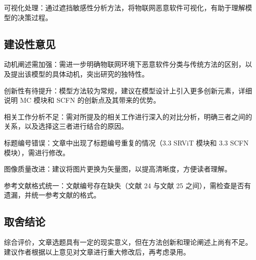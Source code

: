 \documentclass[11pt,a4paper]{article}
\begin{document}
可视化处理：通过遮挡敏感性分析方法，将物联网恶意软件可视化，有助于理解模型的决策过程。

\subsection{建设性意见}

动机阐述需加强：需进一步明确物联网环境下恶意软件分类与传统方法的区别，以及提出该模型的具体动机，突出研究的独特性。

创新性有待提升：模型方法较为常规，建议在模型设计上引入更多创新元素，详细说明 MC 模块和 SCFN 的创新点及其带来的优势。

相关工作分析不足：需对所提及的相关工作进行深入的对比分析，明确三者之间的关系，以及选择这三者进行结合的原因。

标题编号错误：文章中出现了标题编号重复的情况（3.3 SRViT 模块和 3.3 SCFN 模块），需进行修改。

图像质量改进：建议将图片更换为矢量图，以提高清晰度，方便读者理解。

参考文献格式统一：文献编号存在缺失（文献 24 与文献 25 之间），需检查是否有遗漏，并统一参考文献的格式。

\subsection{取舍结论}

综合评价，文章选题具有一定的现实意义，但在方法创新和理论阐述上尚有不足。建议作者根据以上意见对文章进行重大修改后，再考虑录用。



% 
% 
\end{document}
